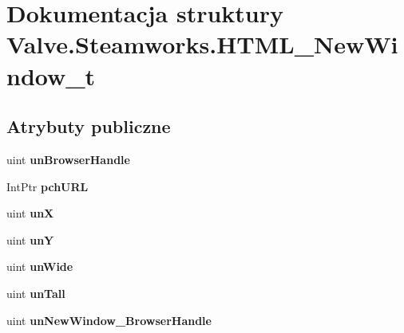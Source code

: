 \hypertarget{struct_valve_1_1_steamworks_1_1_h_t_m_l___new_window__t}{}\section{Dokumentacja struktury Valve.\+Steamworks.\+H\+T\+M\+L\+\_\+\+New\+Window\+\_\+t}
\label{struct_valve_1_1_steamworks_1_1_h_t_m_l___new_window__t}
\subsection*{Atrybuty publiczne}
\begin{DoxyCompactItemize}
\item 
\mbox{\label{struct_valve_1_1_steamworks_1_1_h_t_m_l___new_window__t_a5cec08adefeb5eb917061592d124db55}} 
uint {\bfseries un\+Browser\+Handle}
\item 
\mbox{\label{struct_valve_1_1_steamworks_1_1_h_t_m_l___new_window__t_a1956bdf3f5bb9e9e2b77564c6991ec97}} 
Int\+Ptr {\bfseries pch\+U\+RL}
\item 
\mbox{\label{struct_valve_1_1_steamworks_1_1_h_t_m_l___new_window__t_aeb2f99792387c6b626ebbf334b3dbc0f}} 
uint {\bfseries unX}
\item 
\mbox{\label{struct_valve_1_1_steamworks_1_1_h_t_m_l___new_window__t_ac1b24c6d23060a33da93388cf4d4ad38}} 
uint {\bfseries unY}
\item 
\mbox{\label{struct_valve_1_1_steamworks_1_1_h_t_m_l___new_window__t_a064f386b030f1ae24e3a1e5fdc4dfe75}} 
uint {\bfseries un\+Wide}
\item 
\mbox{\label{struct_valve_1_1_steamworks_1_1_h_t_m_l___new_window__t_aa53735b02c3c619fd578d6db98036429}} 
uint {\bfseries un\+Tall}
\item 
\mbox{\label{struct_valve_1_1_steamworks_1_1_h_t_m_l___new_window__t_a4b1791462fd48e1d06c1c1f6e6f1f510}} 
uint {\bfseries un\+New\+Window\+\_\+\+Browser\+Handle}
\end{DoxyCompactItemize}


